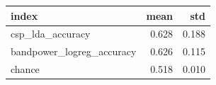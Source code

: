\begin{tabular}{lrr}
\toprule
index & mean & std \\
\midrule
csp_lda_accuracy & 0.628 & 0.188 \\
bandpower_logreg_accuracy & 0.626 & 0.115 \\
chance & 0.518 & 0.010 \\
\bottomrule
\end{tabular}
